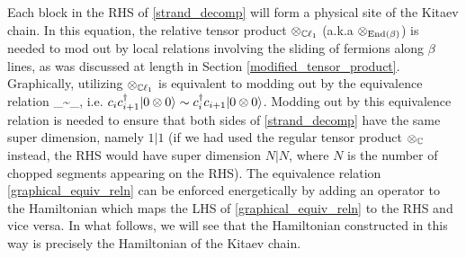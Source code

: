 Each block in the RHS of \eqref{strand_decomp} will form a physical site of the Kitaev chain. 
In this equation, the relative tensor product $\otimes_{\mathbb{C}\ell_1}$ (a.k.a $\otimes_{\text{End}(\beta)}$) is needed to mod out by local relations involving the sliding of fermions along $\beta$ lines, as was discussed at length in Section \ref{modified_tensor_product}. 
Graphically, utilizing $\otimes_{\mathbb{C}\ell_1}$ is equivalent to modding out by the equivalence relation 
\be\label{graphical_equiv_reln} \horizbeta \tp_\cc \horizbetadot \sim \horizbetadot \tp_\cc \horizbeta,\ee
i.e. $c_i c_{i+1}^\dagger |0\otimes 0\rangle \sim c_i^\dagger c_{i+1}|0\otimes0\rangle$. 
Modding out by this equivalence relation is needed to ensure that both sides of \eqref{strand_decomp} have the same super dimension, namely $1|1$ (if we had used the regular tensor product $\otimes_{\mathbb{C}}$ instead, the RHS would have super dimension $N|N$, where $N$ is the number of chopped segments appearing on the RHS). 
The equivalence relation \eqref{graphical_equiv_reln} can be enforced energetically by adding an operator 
to the Hamiltonian which maps the LHS of \eqref{graphical_equiv_reln} to the RHS and vice versa. 
In what follows, we will see that the Hamiltonian constructed in this way is precisely the Hamiltonian of the Kitaev chain. 


